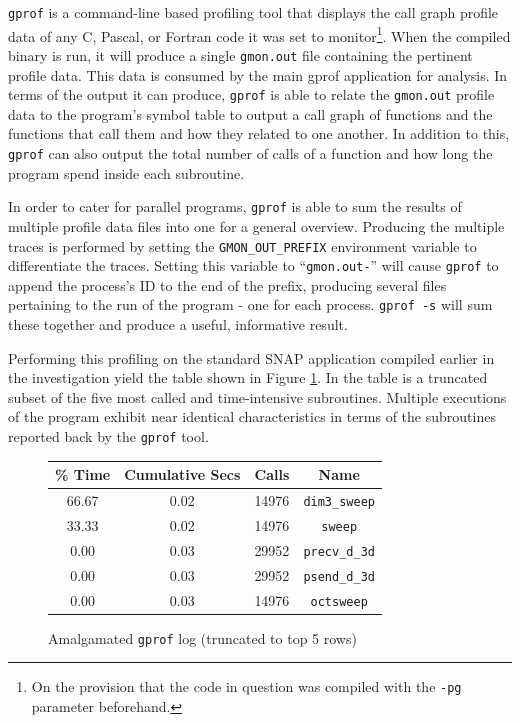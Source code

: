 \documentclass[conference]{IEEEtran}
\begin{document}
\texttt{gprof} is a command-line based profiling tool that displays the call graph profile data of any C, Pascal, or Fortran code it was set to monitor\footnote{On the provision that the code in question was compiled with the \texttt{-pg} parameter beforehand.}. When the compiled binary is run, it will produce a single \texttt{gmon.out} file containing the pertinent profile data. This data is consumed by the main gprof application for analysis. In terms of the output it can produce, \texttt{gprof} is able to relate the \texttt{gmon.out} profile data to the program's symbol table to output a call graph of functions and the functions that call them and how they related to one another. In addition to this, \texttt{gprof} can also output the total number of calls of a function and how long the program spend inside each subroutine.

In order to cater for parallel programs, \texttt{gprof} is able to sum the results of multiple profile data files into one for a general overview. Producing the multiple traces is performed by setting the \texttt{GMON\_OUT\_PREFIX} environment variable to differentiate the traces. Setting this variable to ``\texttt{gmon.out-}'' will cause \texttt{gprof} to append the process's ID to the end of the prefix, producing several files pertaining to the run of the program - one for each process. \texttt{gprof -s} will sum these together and produce a useful, informative result.

Performing this profiling on the standard SNAP application compiled earlier in the investigation yield the table shown in Figure \ref{table:gprof_log}. In the table is a truncated subset of the five most called and time-intensive subroutines. Multiple executions of the program exhibit near identical characteristics in terms of the subroutines reported back by the \texttt{gprof} tool.

\begin{figure}[!h]
    \centering
    \begin{tabular}{ | c | c | c | c | }
\hline
\% Time & Cumulative Secs & Calls & Name \\
\hline
66.67 & 0.02 & 14976 & \texttt{dim3\_sweep} \\
33.33 & 0.02 & 14976 & \texttt{sweep} \\
0.00  & 0.03 & 29952 & \texttt{precv\_d\_3d} \\
0.00  & 0.03 & 29952 & \texttt{psend\_d\_3d} \\
0.00  & 0.03 & 14976 & \texttt{octsweep} \\
\hline
    \end{tabular}
    \caption{Amalgamated \texttt{gprof} log (truncated to top 5 rows)}
    \label{table:gprof_log}
\end{figure}
\end{document}

